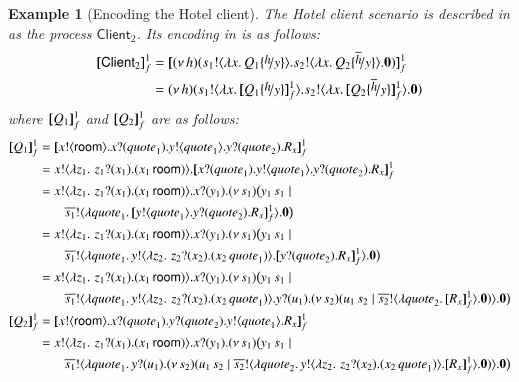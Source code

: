 \documentclass[preprint,11pt]{elsarticle}
\newtheorem{example}{Example}[section]
\newcommand{\rtype}{\mathsf{room}}
\newcommand{\Quotev}{\mathit{quote}}
\newcommand{\Client}{\mathsf{Client}}
\begin{document}
{{\begin{example}[Encoding the Hotel client]
The Hotel client scenario is described in 
 as the \HOp process $\Client_2$. Its encoding in \HO is as follows:
\begin{align*}
\pmap{\Client_2}{1}_f & = \pmap{\newsp{h}{\bout{s_1}{\abs{x}{Q_1 \subst{h}{y}}} \bout{s_2}{\abs{x}{Q_2 \subst{\dual{h}}{y}}} \inact}}{1}_f
\\
 & = \newsp{h}{\bout{s_1}{\abs{x}{\pmap{Q_1 \subst{h}{y}}{1}_f}} \bout{s_2}{\abs{x}{\pmap{Q_2 \subst{\dual{h}}{y}}{1}_f} }\inact}
\end{align*}
where $[\!\![Q_1]\!\!]^1_f$ and $[\!\![Q_2]\!\!]^1_f$ are as follows:
\begin{align*}
 \pmap{Q_1}{1}_f & = \pmap{\bout{x}{\rtype} \binp{x}{\Quotev_1} \bout{y}{\Quotev_1} \binp{y}{\Quotev_2} R_x}{1}_f
 \\
 & = \bout{x}{ \abs{z_1}{\,\binp{z_1}{x_1} (\appl{x_1}{\rtype})} } \pmap{\binp{x}{\Quotev_1} \bout{y}{\Quotev_1} \binp{y}{\Quotev_2} R_x}{1}_f \\
 & =  \bout{x}{ \abs{z_1}{\,\binp{z_1}{x_1} (\appl{x_1}{\rtype})} } \binp{x}{y_1} \newspb{s_1}{\appl{y_1}{s_1} \Par 
 \\
& \qquad  \bout{\dual{s_1}}{\abs{\Quotev_1}{\pmapp{\bout{y}{\Quotev_1} \binp{y}{\Quotev_2} R_x}{1}{f}}} \inact}
\\
 & =  \bout{x}{ \abs{z_1}{\,\binp{z_1}{x_1} (\appl{x_1}{\rtype})} } \binp{x}{y_1} \newspb{s_1}{\appl{y_1}{s_1} \Par 
 \\
& \qquad  \bout{\dual{s_1}}{\abs{\Quotev_1}{\bout{y}{ \abs{z_2}{\,\binp{z_2}{x_2} (\appl{x_2}{\Quotev_1})} }\pmapp{ \binp{y}{\Quotev_2} R_x}{1}{f}}} \inact}
 \\
 & =  \bout{x}{ \abs{z_1}{\,\binp{z_1}{x_1} (\appl{x_1}{\rtype})} } \binp{x}{y_1} \newspb{s_1}{\appl{y_1}{s_1} \Par 
 \\
& \qquad  \bout{\dual{s_1}}{\abs{\Quotev_1}{\bout{y}{ \abs{z_2}{\,\binp{z_2}{x_2} (\appl{x_2}{\Quotev_1})} }\binp{y}{u_1} \newsp{s_2}{\appl{u_1}{s_2} \Par \bout{\dual{s_2}}{\abs{\Quotev_2}{\pmapp{R_x}{1}{f}}} \inact}}} \inact}
\\
 \pmap{Q_2}{1}_f & = \pmap{\bout{x}{\rtype} \binp{x}{\Quotev_1}  \binp{y}{\Quotev_2} \bout{y}{\Quotev_1} R_x}{1}_f
 \\
& =  \bout{x}{ \abs{z_1}{\,\binp{z_1}{x_1} (\appl{x_1}{\rtype})} } \binp{x}{y_1} \newspb{s_1}{\appl{y_1}{s_1} \Par 
 \\
& \qquad  \bout{\dual{s_1}}{\abs{\Quotev_1}{\binp{y}{u_1} \newsp{s_2}{\appl{u_1}{s_2} \Par \bout{\dual{s_2}}{\abs{\Quotev_2}{\bout{y}{ \abs{z_2}{\,\binp{z_2}{x_2} (\appl{x_2}{\Quotev_1})} }\pmapp{R_x}{1}{f}}} \inact}}} \inact}

\end{align*}
\end{example}}}
\end{document}
